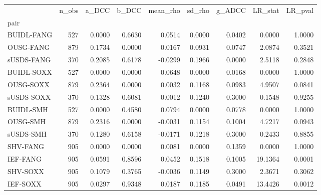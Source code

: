 \begin{tabular}{lrrrrrrrr}
\toprule
 & n\_obs & a\_DCC & b\_DCC & mean\_rho & sd\_rho & g\_ADCC & LR\_stat & LR\_pval \\
pair &  &  &  &  &  &  &  &  \\
\midrule
BUIDL-FANG & 527 & 0.0000 & 0.6630 & 0.0514 & 0.0000 & 0.0402 & 0.0000 & 1.0000 \\
OUSG-FANG & 879 & 0.1734 & 0.0000 & 0.0167 & 0.0931 & 0.0747 & 2.0874 & 0.3521 \\
sUSDS-FANG & 370 & 0.2085 & 0.6178 & -0.0299 & 0.1966 & 0.0000 & 2.5118 & 0.2848 \\
BUIDL-SOXX & 527 & 0.0000 & 0.0000 & 0.0648 & 0.0000 & 0.0168 & 0.0000 & 1.0000 \\
OUSG-SOXX & 879 & 0.2364 & 0.0000 & 0.0032 & 0.1168 & 0.0983 & 4.9507 & 0.0841 \\
sUSDS-SOXX & 370 & 0.1328 & 0.6081 & -0.0012 & 0.1240 & 0.3000 & 0.1548 & 0.9255 \\
BUIDL-SMH & 527 & 0.0000 & 0.4580 & 0.0794 & 0.0000 & 0.0778 & 0.0000 & 1.0000 \\
OUSG-SMH & 879 & 0.2316 & 0.0000 & -0.0031 & 0.1154 & 0.1004 & 4.7217 & 0.0943 \\
sUSDS-SMH & 370 & 0.1280 & 0.6158 & -0.0171 & 0.1218 & 0.3000 & 0.2433 & 0.8855 \\
SHV-FANG & 905 & 0.0000 & 0.0000 & 0.0081 & 0.0000 & 0.1359 & 0.0000 & 1.0000 \\
IEF-FANG & 905 & 0.0591 & 0.8596 & 0.0452 & 0.1518 & 0.1005 & 19.1364 & 0.0001 \\
SHV-SOXX & 905 & 0.1079 & 0.3765 & -0.0036 & 0.1149 & 0.3000 & 2.3671 & 0.3062 \\
IEF-SOXX & 905 & 0.0297 & 0.9348 & 0.0187 & 0.1185 & 0.0491 & 13.4426 & 0.0012 \\
\bottomrule
\end{tabular}
